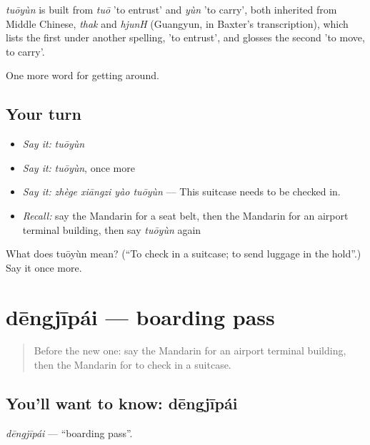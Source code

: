 \begin{cousinweb}
\emph{tuōyùn} is built from \emph{tuō} 'to entrust' and \emph{yùn} 'to carry', both inherited from Middle Chinese, \emph{thak} and \emph{hjunH} (Guangyun, in Baxter's transcription), which lists the first under another spelling, 'to entrust', and glosses the second 'to move, to carry'.
\end{cousinweb}

\begin{grammarlens}[title={What you've built}]
One more word for getting around.
\end{grammarlens}

\subsection*{Your turn}
\begin{itemize}
\raggedright
  \item \emph{Say it:} \emph{tuōyùn}
  \item \emph{Say it:} \emph{tuōyùn}, once more
  \item \emph{Say it:} \emph{zhège xiāngzi yào tuōyùn} — This suitcase needs to be checked in.
  \item \emph{Recall:} say the Mandarin for a seat belt, then the Mandarin for an airport terminal building, then say \emph{tuōyùn} again
\end{itemize}

\begin{tcolorbox}[breakable,colback=teal!4,colframe=teal!35!black,title={Before you move on}]
What does tuōyùn mean? (\textquotedblleft{}To check in a suitcase; to send luggage in the hold\textquotedblright{}.) Say it once more.
\end{tcolorbox}
\section[dēngjīpái]{dēngjīpái — boarding pass}

\label{lesson:ZH-C415-dengjipai}



\begin{quote}
Before the new one: say the Mandarin for an airport terminal building, then the Mandarin for to check in a suitcase.
\end{quote}

\subsection*{You'll want to know: dēngjīpái}
\emph{dēngjīpái} — \textquotedblleft{}boarding pass\textquotedblright{}.

